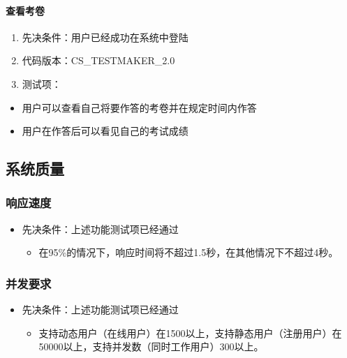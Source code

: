 \documentclass[hyperref, a4paper]{ctexart}
\providecommand{\tightlist}{%
  \setlength{\itemsep}{0pt}\setlength{\parskip}{0pt}}
\let\oldparagraph\paragraph
\renewcommand{\paragraph}[1]{\oldparagraph{#1}\mbox{}}
\begin{document}
\hypertarget{ux67e5ux770bux8003ux5377}{%
\paragraph{查看考卷}\label{ux67e5ux770bux8003ux5377}}

\begin{enumerate}
\def\labelenumi{\arabic{enumi}.}
\tightlist
\item
  先决条件：用户已经成功在系统中登陆
\item
  代码版本：CS\_TESTMAKER\_2.0
\item
  测试项：
\end{enumerate}

\begin{itemize}
\tightlist
\item
  用户可以查看自己将要作答的考卷并在规定时间内作答
\item
  用户在作答后可以看见自己的考试成绩
\end{itemize}

\hypertarget{ux7cfbux7edfux8d28ux91cf}{%
\subsection{系统质量}\label{ux7cfbux7edfux8d28ux91cf}}

\hypertarget{ux54cdux5e94ux901fux5ea6}{%
\subsubsection{响应速度}\label{ux54cdux5e94ux901fux5ea6}}

\begin{itemize}
\tightlist
\item
  先决条件：上述功能测试项已经通过

  \begin{itemize}
  \tightlist
  \item
    在95\%的情况下，响应时间将不超过1.5秒，在其他情况下不超过4秒。
  \end{itemize}
\end{itemize}

\hypertarget{ux5e76ux53d1ux8981ux6c42}{%
\subsubsection{并发要求}\label{ux5e76ux53d1ux8981ux6c42}}

\begin{itemize}
\tightlist
\item
  先决条件：上述功能测试项已经通过

  \begin{itemize}
  \tightlist
  \item
    支持动态用户（在线用户）在1500以上，支持静态用户（注册用户）在50000以上，支持并发数（同时工作用户）300以上。
  \end{itemize}
\end{itemize}
\end{document}
